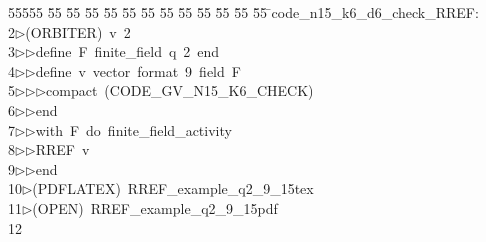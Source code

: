 %
%
\begin{tabbing}
55555 \= 55 \= 55 \= 55 \= 55 \= 55 \= 55 \= 55 \= 55 \= 55 \= 55 \= 55 \= 55 \= \>code\_n15\_k6\_d6\_check\_RREF:\\[0pt]
2\>$\triangleright$\>(ORBITER)\ v\ 2\ \\[0pt]
3\>$\triangleright$\>$\triangleright$\>define\ F\ finite\_field\ q\ 2\ end\ \\[0pt]
4\>$\triangleright$\>$\triangleright$\>define\ v\ vector\ format\ 9\ field\ F\ \\[0pt]
5\>$\triangleright$\>$\triangleright$\>$\triangleright$\>compact\ (CODE\_GV\_N15\_K6\_CHECK)\ \\[0pt]
6\>$\triangleright$\>$\triangleright$\>end\ \\[0pt]
7\>$\triangleright$\>$\triangleright$\>with\ F\ do\ finite\_field\_activity\ \\[0pt]
8\>$\triangleright$\>$\triangleright$\>RREF\ v\ \\[0pt]
9\>$\triangleright$\>$\triangleright$\>end\\[0pt]
10\>$\triangleright$\>(PDFLATEX)\ RREF\_example\_q2\_9\_15tex\\[0pt]
11\>$\triangleright$\>(OPEN)\ RREF\_example\_q2\_9\_15pdf\\[0pt]
12\>\end{tabbing}
